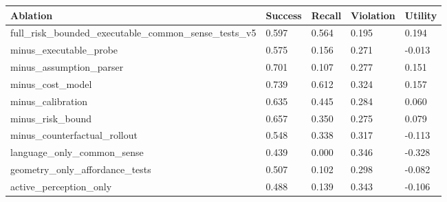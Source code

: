 \begin{tabular}{lllll}
\toprule
Ablation & Success & Recall & Violation & Utility \\
\midrule
full\_risk\_bounded\_executable\_common\_sense\_tests\_v5 & 0.597 & 0.564 & 0.195 & 0.194 \\
minus\_executable\_probe & 0.575 & 0.156 & 0.271 & -0.013 \\
minus\_assumption\_parser & 0.701 & 0.107 & 0.277 & 0.151 \\
minus\_cost\_model & 0.739 & 0.612 & 0.324 & 0.157 \\
minus\_calibration & 0.635 & 0.445 & 0.284 & 0.060 \\
minus\_risk\_bound & 0.657 & 0.350 & 0.275 & 0.079 \\
minus\_counterfactual\_rollout & 0.548 & 0.338 & 0.317 & -0.113 \\
language\_only\_common\_sense & 0.439 & 0.000 & 0.346 & -0.328 \\
geometry\_only\_affordance\_tests & 0.507 & 0.102 & 0.298 & -0.082 \\
active\_perception\_only & 0.488 & 0.139 & 0.343 & -0.106 \\
\bottomrule
\end{tabular}
